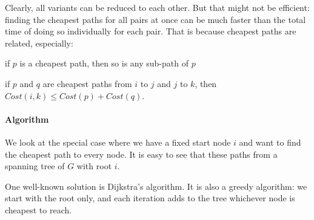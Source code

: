 Clearly, all variants can be reduced to each other.
But that might not be efficient: finding the cheapest paths for all pairs at once can be much faster than the total time of doing so individually for each pair.
That is because cheapest paths are related, especially:
\begin{compactitem}
  \item if $p$ is a cheapest path, then so is any sub-path of $p$
  \item if $p$ and $q$ are cheapest paths from $i$ to $j$ and $j$ to $k$, then $Cost(i,k)\leq Cost(p)+Cost(q)$.
\end{compactitem}

\paragraph{Algorithm}
We look at the special case where we have a fixed start node $i$ and want to find the cheapest path to every node.
It is easy to see that these paths from a spanning tree of $G$ with root $i$.

One well-known solution is Dijkstra's algorithm.
It is also a greedy algorithm: we start with the root only, and each iteration adds to the tree whichever node is cheapest to reach.

\begin{acode}
\end{acode}

